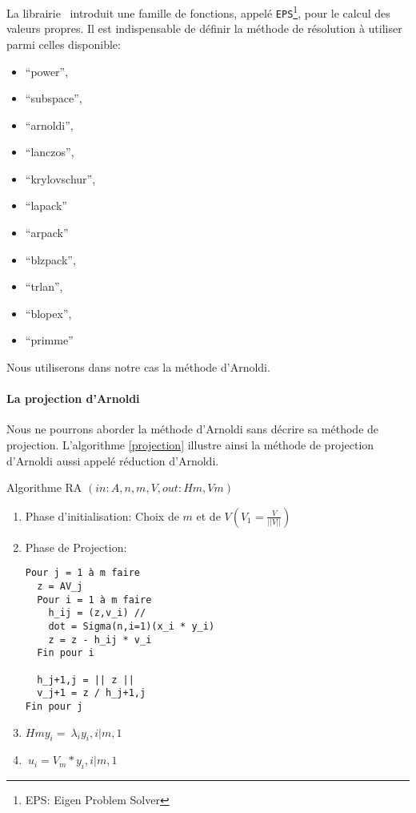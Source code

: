 La librairie \slepc\ introduit une famille de fonctions, appelé \verb#EPS#\footnote{EPS: Eigen Problem Solver}, pour le calcul des valeurs propres. Il est indispensable de définir la méthode de résolution à utiliser parmi celles disponible:\\

\begin{itemize}
\item ``power'',
\item ``subspace'',
\item ``arnoldi'',
\item ``lanczos'',
\item ``krylovschur'',
\item ``lapack''
\item ``arpack''
\item ``blzpack'',
\item ``trlan'',
\item ``blopex'',
\item ``primme''\\
\end{itemize}

Nous utiliserons dans notre cas la méthode d'Arnoldi.


\paragraph{La projection d'Arnoldi}

Nous ne pourrons aborder la méthode d'Arnoldi sans décrire sa méthode de projection. L'algorithme \ref{projection} illustre ainsi la méthode de projection d'Arnoldi aussi appelé réduction d'Arnoldi.

\begin{algorithm}[h]
  \caption{Algorithme RA $(in:A,n,m,V,out:Hm,Vm)$}
  \label{projection}
\begin{enumerate}
\item Phase d'initialisation: Choix de $m$ et de $V (V_1 = \frac{V}{||V||})$
\item Phase de Projection:
\begin{verbatim}
Pour j = 1 à m faire
  z = AV_j
  Pour i = 1 à m faire
    h_ij = (z,v_i) //
    dot = Sigma(n,i=1)(x_i * y_i)
    z = z - h_ij * v_i
  Fin pour i

  h_j+1,j = || z ||
  v_j+1 = z / h_j+1,j
Fin pour j
\end{verbatim}

\item $Hm y_i = ~\lambda_i y_i, i|m,1$
\item $~u_i = V_m * y_i, i|m,1$

\end{enumerate}
\end{algorithm}

